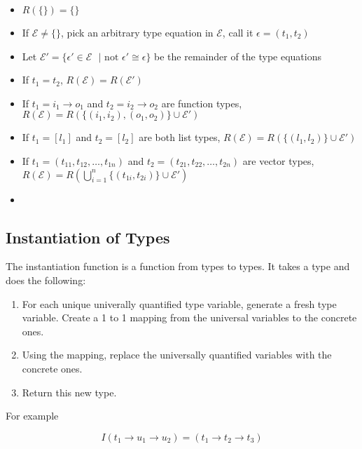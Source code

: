 \documentclass[titlepage]{article}
\begin{document}
\begin{itemize}
\item $R(\{\}) = \{\}$

\item If $\mathcal{E} \neq \{\}$, pick an arbitrary type equation in $\mathcal{E}$, call it $\epsilon = (t_1, t_2)$

\item Let $\mathcal{E}' = \{\epsilon' \in \mathcal{E} \text{ } | \text{ not } \epsilon' \cong \epsilon \}$ be the remainder of the type equations

\item If $t_1 = t_2$, $R(\mathcal{E}) = R(\mathcal{E}')$

\item If $t_1 = i_1 \rightarrow o_1$ and $t_2 = i_2 \rightarrow o_2$ are function types, $R(\mathcal{E}) = R(\{(i_1, i_2), (o_1, o_2)\}\cup\mathcal{E}')$

\item If $t_1 = [l_1]$ and $t_2 = [l_2]$ are both list types, $R(\mathcal{E}) = R(\{(l_1, l_2)\}\cup\mathcal{E}')$
\item If $t_1 = (t_{11}, t_{12}, \dots, t_{1n})$ and $t_2 = (t_{21}, t_{22}, \dots, t_{2n})$ are vector types, $R(\mathcal{E}) = R(\bigcup_{i = 1} ^ n \{(t_{1i}, t_{2i})\} \cup\mathcal{E}')$
\item 

\end{itemize}


\subsection{Instantiation of Types}

The instantiation function is a function from types to types. It takes a type and does the following:

\begin{enumerate}
\item For each unique univerally quantified type variable, generate a fresh type variable. Create a 1 to 1 mapping from the universal variables to the concrete ones.
\item Using the mapping, replace the universally quantified variables with the concrete ones.
\item Return this new type.

\end{enumerate}

For example

$$I(t_1 \rightarrow u_1 \rightarrow u_2 ) = (t_1 \rightarrow t_2 \rightarrow t_3)$$
\end{document}
